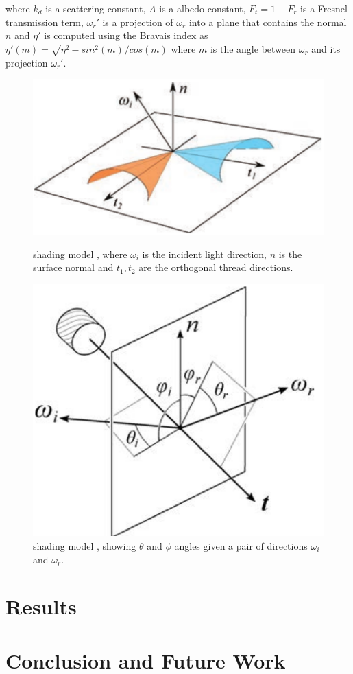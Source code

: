 \documentclass[12pt]{article}
\begin{document}
where $k_d$ is a scattering constant, $A$ is a albedo constant, $F_t = 1 - F_r$ is a Fresnel transmission term, $\omega_r'$ is a projection of $\omega_r$ into a plane that contains the normal $n$ and $\eta'$ is computed using the Bravais index \cite{Marschner2003} as $\eta'(m) = \sqrt{\eta^2 - sin^2(m)}  / cos(m)$ where $m$ is the angle between $\omega_r$ and its projection $\omega_r'$.

\begin{figure}[ht!]
\begin{minipage}[b]{.45\textwidth}
\centering
\includegraphics[width=1\textwidth]{images/microcylinders}
	\caption{\citeauthor{Sadeghi2013} shading model \cite{Sadeghi2013}, where $\omega_i$ is the incident light direction, $n$ is the surface normal and $t_1,t_2$ are the orthogonal thread directions.}
	\label{fig:microcylinders}
\end{minipage}
\hfill
\begin{minipage}[b]{.45\textwidth}
\centering
\includegraphics[width=1\textwidth]{images/cloth_directions}
	\caption{\citeauthor{Sadeghi2013} shading model \cite{Sadeghi2013}, showing $\theta$ and $\phi$ angles given a pair of directions $\omega_i$ and $\omega_r$.}
	\label{fig:cloth_directions}
\end{minipage}
\end{figure}

\section{Results}

\section{Conclusion and Future Work}



\end{document}
